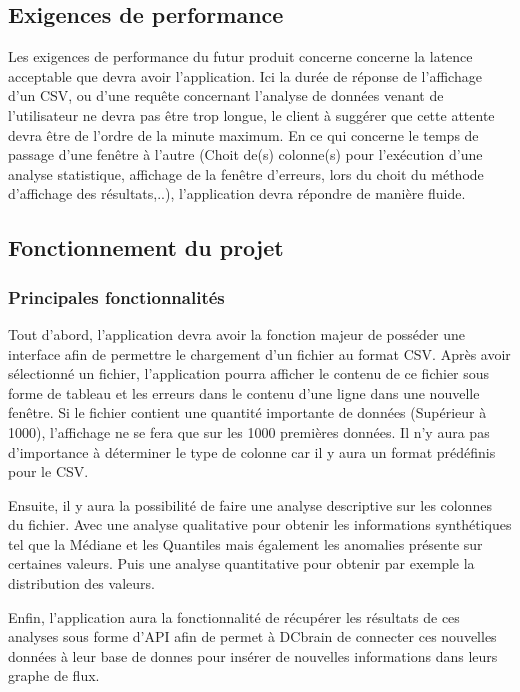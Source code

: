 		\subsection{Exigences de performance}
		Les exigences de performance du futur produit concerne concerne la latence acceptable que devra avoir l'application. Ici la durée de réponse de l’affichage d’un CSV, ou d’une requête concernant l’analyse de données venant de l’utilisateur ne devra pas être trop longue, le client à suggérer que cette attente devra être de l’ordre de la minute maximum. En ce qui concerne le temps de passage d'une fenêtre à l'autre (Choit de(s) colonne(s) pour l'exécution d'une analyse statistique, affichage de la fenêtre d'erreurs, lors du choit du méthode d’affichage des résultats,..), l’application devra répondre de manière fluide. 

		\subsection{Fonctionnement du projet}
			\subsubsection{Principales fonctionnalités}
			Tout d’abord, l’application devra avoir la fonction majeur de posséder une interface afin de permettre le chargement d’un fichier au format CSV. Après avoir sélectionné un fichier, l’application pourra afficher le contenu de ce fichier sous forme de tableau et les erreurs dans le contenu d'une ligne dans une nouvelle fenêtre. Si le fichier contient une quantité importante de données (Supérieur à 1000), l’affichage ne se fera que sur les 1000 premières données.
			Il n’y aura pas d’importance à déterminer le type de colonne car il y aura un format prédéfinis pour le CSV.\newline

			Ensuite, il y aura la possibilité de faire une analyse descriptive sur les colonnes du fichier. Avec une analyse qualitative pour obtenir les informations synthétiques tel que la Médiane et les Quantiles mais également les anomalies présente sur certaines valeurs. Puis une analyse quantitative pour obtenir par exemple la distribution des valeurs.\newline

			Enfin, l’application aura la fonctionnalité de récupérer les résultats de ces analyses sous forme d’API afin de permet à DCbrain de connecter ces nouvelles données à leur base de donnes pour insérer de nouvelles informations dans leurs graphe de flux.

